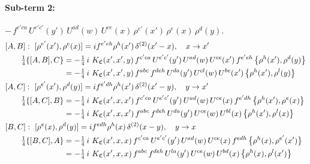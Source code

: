 \documentclass[10pt]{article}
\numberwithin{equation}{section}
\begin{document}
\paragraph{Sub-term 2:} $-\,f^{c'ca}\,U^{e'c'}(y')\,U^{ad}(w)\,U^{ce}(x)\,\rho^{e'}(x')\,\rho^{e}(x)\,\rho^{d}(y)$.
\begin{align}
&[A,B]:\ [\rho^{e'}(x'),\rho^{e}(x)]=i f^{e'eh}\rho^{h}(x')\,\delta^{(2)}(x'-x),\quad x\to x'\notag\\
&\qquad \tfrac14\{[A,B],C\}=-\tfrac14\,i\,\,K_{\mathfrak C}(x',x',y)\,f^{c'ca}\,U^{e'c'}(y')\,U^{ad}(w)\,U^{ce}(x')\,f^{e'eh}\,\big\{\rho^{h}(x'),\rho^{d}(y)\big\}\notag\\
&\qquad\phantom{\tfrac14\{[A,B],C\}}=-\tfrac14\,i\,\,K_{\mathfrak C}(x',x',y)\,f^{abc}\,f^{deh}\,U^{da}(y')\,U^{cl}(w)\,U^{be}(x')\,\big\{\rho^{h}(x'),\rho^{l}(y)\big\}
\label{eq:GIII.V-2-AB}\\
&[A,C]:\ [\rho^{e'}(x'),\rho^{d}(y)]=i f^{e'dh}\rho^{h}(x')\,\delta^{(2)}(x'-y),\quad y\to x'\notag\\
&\qquad \tfrac14\{[A,C],B\}=-\tfrac14\,i\,\,K_{\mathfrak C}(x',x,x')\,f^{c'ca}\,U^{e'c'}(y')\,U^{ad}(w)\,U^{ce}(x)\,f^{e'dh}\,\big\{\rho^{h}(x'),\rho^{e}(x)\big\}\notag\\
&\qquad\phantom{\tfrac14\{[A,C],B\}}=-\tfrac14\,i\,\,K_{\mathfrak C}(x',x,x')\,f^{abc}\,f^{deh}\,U^{da}(y')\,U^{ce}(w)\,U^{bl}(x)\,\big\{\rho^{h}(x'),\rho^{l}(x)\big\}
\label{eq:GIII.V-2-AC}\\
&[B,C]:\ [\rho^{e}(x),\rho^{d}(y)]=i f^{edh}\rho^{h}(x)\,\delta^{(2)}(x-y),\quad y\to x\notag\\
&\qquad \tfrac14\{[B,C],A\}=-\tfrac14\,i\,\,K_{\mathfrak C}(x',x,x)\,f^{c'ca}\,U^{e'c'}(y')\,U^{ad}(w)\,U^{ce}(x)\,f^{edh}\,\big\{\rho^{h}(x),\rho^{e'}(x')\big\}\notag\\
&\qquad\phantom{\tfrac14\{[B,C],A\}}=-\tfrac14\,i\,\,K_{\mathfrak C}(x',x,x)\,f^{abc}\,f^{deh}\,U^{la}(y')\,U^{ce}(w)\,U^{bd}(x)\,\big\{\rho^{h}(x),\rho^{l}(x')\big\}
\label{eq:GIII.V-2-BC}
\end{align}
\end{document}

